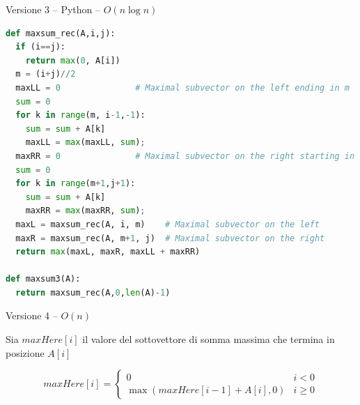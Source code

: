 \begin{frame}[fragile]{Versione 3 -- Python -- $O(n \log n)$}

\footnotesize
\vspace{-21pt}
\begin{lstlisting}[language=python]
def maxsum_rec(A,i,j):
  if (i==j):
    return max(0, A[i])  
  m = (i+j)//2
  maxLL = 0               # Maximal subvector on the left ending in m
  sum = 0
  for k in range(m, i-1,-1):
    sum = sum + A[k]
    maxLL = max(maxLL, sum);
  maxRR = 0               # Maximal subvector on the right starting in m+1
  sum = 0
  for k in range(m+1,j+1):
    sum = sum + A[k]
    maxRR = max(maxRR, sum);
  maxL = maxsum_rec(A, i, m)    # Maximal subvector on the left
  maxR = maxsum_rec(A, m+1, j)  # Maximal subvector on the right
  return max(maxL, maxR, maxLL + maxRR)

def maxsum3(A):
  return maxsum_rec(A,0,len(A)-1)
\end{lstlisting}	



%
  
\end{frame}  


\begin{frame}[fragile]{Versione 4  -- $O(n)$}

\vspace{-9pt}
\begin{myboxtitle}
Sia \alert{$\mathit{maxHere}[i]$} il valore del sottovettore di somma massima che termina in posizione $A[i]$

\[
\mathit{maxHere}[i] = \begin{cases}
  0 & i<0 \\
  \max(\mathit{maxHere}[i-1]+A[i], 0) & i \geq 0
\end{cases}
\]


\end{myboxtitle}


\end{frame}

